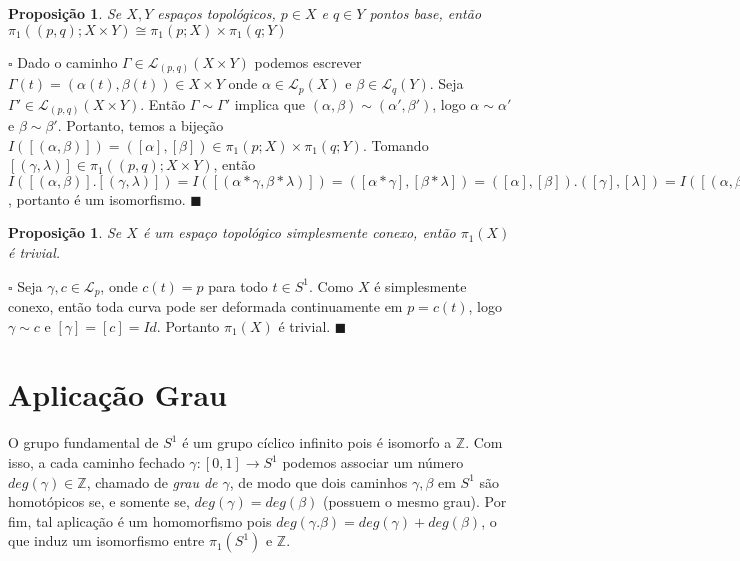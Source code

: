 \documentclass[12pt]{book}
\newtheorem{proposicao}[teorema]{Proposição}
\newenvironment{prova}[1]{$\square$ #1}{\hfill$\blacksquare$}
\newcommand{\caminhos}{\mathcal{L}}
\newcommand{\caminhospontobase}[1]{\caminhos_{#1}}
\newcommand{\caminhospontobasegeral}[2]{\caminhos_{#1}(#2)}
\newcommand{\circulo}{S^{1}}
\newcommand{\classe}[1]{[#1]}
\newcommand{\grupofundamental}[1]{\pi_{1}(#1)}
\newcommand{\grupofundamentalpontobase}[2]{\pi_{1}(#1; #2)}
\newcommand{\inteiros}{\mathbb{Z}}
\begin{document}
	\begin{proposicao}\label{proposicao_produto_grupo_fundamental}
		Se $X, Y$ espaços topológicos, $p\in X$ e $q\in Y$ pontos base, então $\grupofundamentalpontobase{(p,q)}{X\times Y} \cong \grupofundamentalpontobase{p}{X}\times \grupofundamentalpontobase{q}{Y}$
	\end{proposicao}
	\begin{prova}
		Dado o caminho $\Gamma \in \caminhospontobasegeral{(p,q)}{X\times Y}$ podemos escrever $\Gamma(t) = (\alpha(t), \beta(t)) \in X\times Y$ onde $\alpha \in \caminhospontobasegeral{p}{X}$ e $\beta \in \caminhospontobasegeral{q}{Y}$. Seja $\Gamma' \in \caminhospontobasegeral{(p,q)}{X\times Y}$. Então $\Gamma \sim \Gamma'$ implica que $ (\alpha, \beta) \sim (\alpha', \beta')$, logo $\alpha \sim \alpha'$ e $\beta \sim \beta'$. Portanto, temos a bijeção $I(\classe{ (\alpha, \beta)}) =  (\classe{\alpha}, \classe{\beta}) \in \grupofundamentalpontobase{p}{X}\times \grupofundamentalpontobase{q}{Y}$. Tomando $\classe{(\gamma, \lambda)} \in \grupofundamentalpontobase{(p,q)}{X\times Y}$, então $I(\classe{(\alpha, \beta)} .\classe{(\gamma, \lambda)} ) = I(\classe{(\alpha*\gamma, \beta*\lambda)} ) = (\classe{\alpha*\gamma}, \classe{\beta*\lambda})=(\classe{\alpha}, \classe{\beta}) .(\classe{\gamma}, \classe{\lambda}) = I(\classe{(\alpha, \beta)} ).I(\classe{(\gamma, \lambda)} )$, portanto é um isomorfismo.
	\end{prova}
	
	\begin{proposicao}\label{proposicao_grupo_fundamental_simplesmente_conexo}
		Se $X$ é um espaço topológico simplesmente conexo, então $\grupofundamental{X}$ é trivial.
	\end{proposicao}
	\begin{prova}
		Seja $\gamma, c \in \caminhospontobase{p}$, onde $c(t)=p$ para todo $t\in \circulo$. Como $X$ é simplesmente conexo, então toda curva pode ser deformada continuamente em $p=c(t)$, logo $\gamma \sim c$ e $\classe{\gamma} = \classe{c} = Id$. Portanto $\grupofundamental{X}$ é trivial.
	\end{prova}
	
	\section{Aplicação Grau}
	O grupo fundamental de $S^{1}$ é um grupo cíclico infinito pois é isomorfo a $\inteiros$. Com isso, a cada caminho fechado $\gamma:[0,1] \to S^{1}$ podemos associar um número $deg(\gamma) \in \inteiros$, chamado de \textit{grau de $\gamma$}, de modo que dois caminhos $\gamma, \beta$ em $S^{1}$ são homotópicos se, e somente se, $deg(\gamma) = deg(\beta)$ (possuem o mesmo grau). Por fim, tal aplicação é um homomorfismo pois $deg(\gamma.\beta)=deg(\gamma)+deg(\beta)$, o que induz um isomorfismo entre $\pi_{1}(S^{1})$ e $\inteiros$.
	
\end{document}
